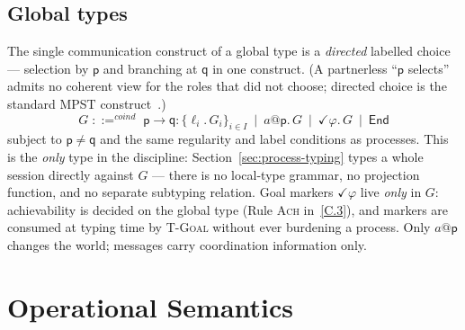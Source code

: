 \documentclass{article}
\theoremstyle{plain}
\theoremstyle{definition}
\newcommand{\coind}{\mathrel{::=^{\mathit{coind}}}}
\newcommand{\End}{\mathsf{End}}
\def \bmr {}
\def \emr {}
\begin{document}
\subsection{Global types}
\label{sec:types-syntax}
The single communication construct of a global type is a \emph{directed}
labelled choice --- selection by $\mathsf p$ and branching at $\mathsf q$ in one
construct. (A partnerless ``$\mathsf p$ selects'' admits no coherent view for the
roles that did not choose; directed choice is the standard MPST
construct~\cite{honda,yoshidagheri}.)
\[
G \;\coind\; \mathsf{p}{\to}\mathsf{q}:\{\ell_i.\,G_i\}_{i\in I}
  \ \mid\ a@\mathsf{p}.\,G
  \ \mid\ \checkmark\varphi.\,G
  \ \mid\ \End
\]
subject to $\mathsf p\neq\mathsf q$ and the same regularity and label
conditions as processes. This is the \emph{only} type in the discipline:
Section~\ref{sec:process-typing} types a whole session directly against $G$ ---
there is no local-type grammar,
no projection function, and no separate subtyping relation. 
Goal
markers $\checkmark\varphi$ live \emph{only} in $G$: achievability is decided on
the global type (Rule \textsc{Ach} \bmr in~\ref{C.3}), \emr and markers are consumed at typing time by
\textsc{T-Goal} without ever burdening a process. Only $a@\mathsf p$ changes the
world; messages carry coordination information only.

\section{Operational Semantics}\label{app:semantics}
\end{document}

